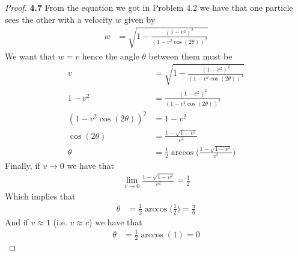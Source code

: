 \documentclass[11pt]{article}
\theoremstyle{definition}
\begin{document}
\begin{proof}{\textbf{4.7}}
    From the equation we got in Problem 4.2 we have that one particle sees
    the other with a velocity $w$ given by
    \begin{align*}
        w &= \sqrt{1 - \frac{(1 - v^2)^2}{(1 - v^2\cos(2\theta))^2}}
    \end{align*}
    We want that $w = v$ hence the angle $\theta$ between them must be 
    \begin{align*}
        v &= \sqrt{1 - \frac{(1 - v^2)^2}{(1 - v^2\cos(2\theta))^2}}\\
        1 - v^2  &= \frac{(1 - v^2)^2}{(1 - v^2\cos(2\theta))^2}\\
        (1 - v^2\cos(2\theta))^2  &= 1 - v^2\\
        \cos(2\theta)  &= \frac{1 - \sqrt{1 - v^2}}{v^2}\\
        \theta &= \frac{1}{2}\arccos\bigg(\frac{1 - \sqrt{1 - v^2}}{v^2}\bigg)
    \end{align*}
    Finally, if $v \to 0$ we have that
    \begin{align*}
        \lim_{v \to 0}\frac{1 - \sqrt{1 - v^2}}{v^2} = \frac{1}{2}
    \end{align*}
    Which implies that 
    \begin{align*}
        \theta &= \frac{1}{2}\arccos\bigg(\frac{1}{2}\bigg) = \frac{\pi}{6}
    \end{align*}
    And if $v \approx 1$ (i.e. $v \approx c$) we have that
    \begin{align*}
        \theta &= \frac{1}{2}\arccos(1) = 0
    \end{align*}
\end{proof}
\end{document}
